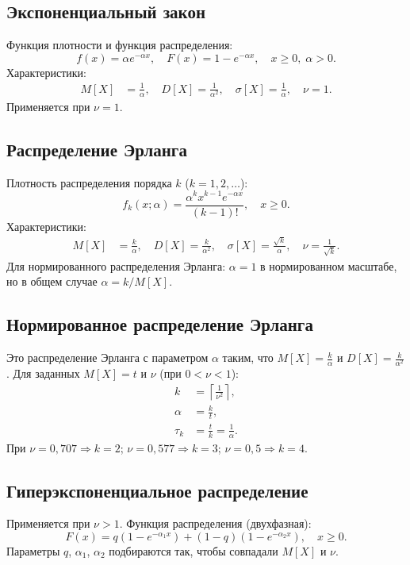 \documentclass[a4paper,12pt]{article}
\begin{document}
\subsection{Экспоненциальный закон}
Функция плотности и функция распределения:
\begin{equation}
f(x) = \alpha e^{-\alpha x}, \quad F(x) = 1 - e^{-\alpha x}, \quad x \geq 0, \; \alpha > 0.
\end{equation}
Характеристики:
\begin{align}
M[X] &= \frac{1}{\alpha}, \quad D[X] = \frac{1}{\alpha^2}, \quad \sigma[X] = \frac{1}{\alpha}, \quad \nu = 1.
\end{align}
Применяется при $\nu = 1$.

\subsection{Распределение Эрланга}
Плотность распределения порядка $k$ ($k = 1, 2, \dots$):
\begin{equation}
f_k(x; \alpha) = \frac{\alpha^k x^{k-1} e^{-\alpha x}}{(k-1)!}, \quad x \geq 0.
\end{equation}
Характеристики:
\begin{align}
M[X] &= \frac{k}{\alpha}, \quad D[X] = \frac{k}{\alpha^2}, \quad \sigma[X] = \frac{\sqrt{k}}{\alpha}, \quad \nu = \frac{1}{\sqrt{k}}.
\end{align}
Для нормированного распределения Эрланга: $\alpha = 1$ в нормированном масштабе, но в общем случае $\alpha = k/M[X]$.

\subsection{Нормированное распределение Эрланга}
Это распределение Эрланга с параметром $\alpha$ таким, что $M[X] = \frac{k}{\alpha}$ и $D[X] = \frac{k}{\alpha^2}$.
Для заданных $M[X] = t$ и $\nu$ (при $0 < \nu < 1$):
\begin{align}
k &= \left\lceil \frac{1}{\nu^2} \right\rceil, \label{eq:k_erlang} \\
\alpha &= \frac{k}{t}, \label{eq:alpha_erlang} \\
\tau_k &= \frac{t}{k} = \frac{1}{\alpha}. \label{eq:tau}
\end{align}
При $\nu = 0{,}707 \Rightarrow k=2$; $\nu = 0{,}577 \Rightarrow k=3$; $\nu = 0{,}5 \Rightarrow k=4$.

\subsection{Гиперэкспоненциальное распределение}
Применяется при $\nu > 1$. Функция распределения (двухфазная):
\begin{equation}
F(x) = q\left(1 - e^{-\alpha_1 x}\right) + (1-q)\left(1 - e^{-\alpha_2 x}\right), \quad x \geq 0.
\end{equation}
Параметры $q$, $\alpha_1$, $\alpha_2$ подбираются так, чтобы совпадали $M[X]$ и $\nu$.
\end{document}
